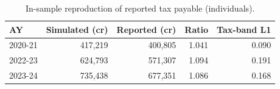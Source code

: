 \begin{table}[t]
\centering\small
\caption{In-sample reproduction of reported tax payable (individuals).}
\label{tab:backtest_in_sample}
\begin{tabular}{lrrrr}
\toprule
AY & Simulated (cr) & Reported (cr) & Ratio & Tax-band L1 \\
\midrule
2020-21 & 417,219 & 400,805 & 1.041 & 0.090 \\
2022-23 & 624,793 & 571,307 & 1.094 & 0.191 \\
2023-24 & 735,438 & 677,351 & 1.086 & 0.168 \\
\bottomrule
\end{tabular}
\end{table}
